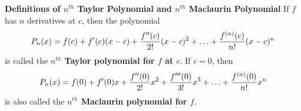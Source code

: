 \nopagenumbers
{\bf Definitions of $n^{th}$ Taylor Polynomial and $n^{th}$ Maclaurin Polynomial}
\vskip 6pt
If $f$ has $n$ derivatives at $c$, then the polynomial $$P_n(x)=f(c)+f'(c)(x-c)+{f''(c)\over 2!}(x-c)^2+\ldots+{{f^{(n)}(c)\over n!}(x-c)^n}$$ is called the {\bf $n^{th}$ Taylor polynomial for $f$ at $c$}. If $c=0$, then $$P_n(x)=f(0)+f'(0)x+{f''(0)\over 2!}x^2+{f'''(0)\over 3!}x^3+\ldots+{f^{(n)}(0)\over n!}x^n$$ is also called the {\bf $n^{th}$ Maclaurin polynomial for $f$}.
\vfill\eject
